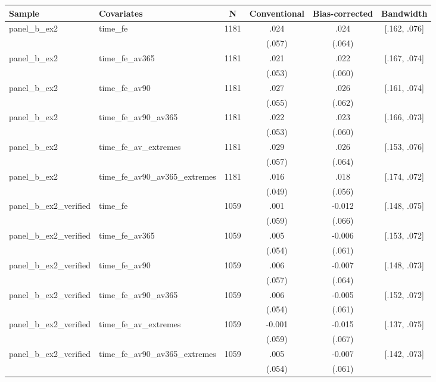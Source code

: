 \begin{tabular}{llcccc}
\hline
Sample & Covariates & N & Conventional & Bias-corrected & Bandwidth \\
\hline
panel\_b\_ex2 & time\_fe & 1181 & .024 & .024 & [.162, .076]
\\
 &  &  & (.057) & (.064) & 
\\
panel\_b\_ex2 & time\_fe\_av365 & 1181 & .021 & .022 & [.167, .074]
\\
 &  &  & (.053) & (.060) & 
\\
panel\_b\_ex2 & time\_fe\_av90 & 1181 & .027 & .026 & [.161, .074]
\\
 &  &  & (.055) & (.062) & 
\\
panel\_b\_ex2 & time\_fe\_av90\_av365 & 1181 & .022 & .023 & [.166, .073]
\\
 &  &  & (.053) & (.060) & 
\\
panel\_b\_ex2 & time\_fe\_av\_extremes & 1181 & .029 & .026 & [.153, .076]
\\
 &  &  & (.057) & (.064) & 
\\
panel\_b\_ex2 & time\_fe\_av90\_av365\_extremes & 1181 & .016 & .018 & [.174, .072]
\\
 &  &  & (.049) & (.056) & 
\\
panel\_b\_ex2\_verified & time\_fe & 1059 & .001 & -0.012 & [.148, .075]
\\
 &  &  & (.059) & (.066) & 
\\
panel\_b\_ex2\_verified & time\_fe\_av365 & 1059 & .005 & -0.006 & [.153, .072]
\\
 &  &  & (.054) & (.061) & 
\\
panel\_b\_ex2\_verified & time\_fe\_av90 & 1059 & .006 & -0.007 & [.148, .073]
\\
 &  &  & (.057) & (.064) & 
\\
panel\_b\_ex2\_verified & time\_fe\_av90\_av365 & 1059 & .006 & -0.005 & [.152, .072]
\\
 &  &  & (.054) & (.061) & 
\\
panel\_b\_ex2\_verified & time\_fe\_av\_extremes & 1059 & -0.001 & -0.015 & [.137, .075]
\\
 &  &  & (.059) & (.067) & 
\\
panel\_b\_ex2\_verified & time\_fe\_av90\_av365\_extremes & 1059 & .005 & -0.007 & [.142, .073]
\\
 &  &  & (.054) & (.061) & 
\\
\hline
\end{tabular}
